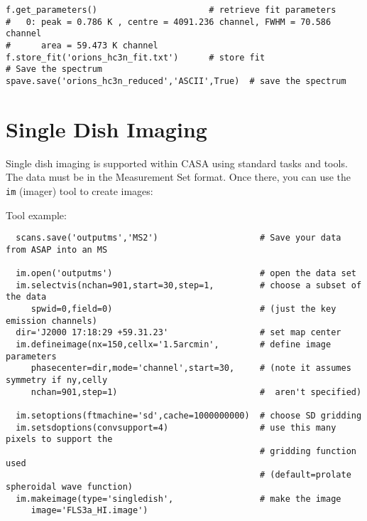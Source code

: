 \small
\begin{verbatim}
f.get_parameters()                      # retrieve fit parameters
#   0: peak = 0.786 K , centre = 4091.236 channel, FWHM = 70.586 channel
#      area = 59.473 K channel
f.store_fit('orions_hc3n_fit.txt')      # store fit                                     
# Save the spectrum
spave.save('orions_hc3n_reduced','ASCII',True)  # save the spectrum                     
\end{verbatim}
\normalsize

\section{Single Dish Imaging}
\label{section:sd.imaging}

Single dish imaging is supported within CASA using standard
tasks and tools. The data must be in the Measurement Set format. Once
there, you can use the {\tt im} (imager) tool
to create images:

Tool example:

\small
\begin{verbatim}
  scans.save('outputms','MS2')                    # Save your data from ASAP into an MS

  im.open('outputms')                             # open the data set
  im.selectvis(nchan=901,start=30,step=1,         # choose a subset of the data   
     spwid=0,field=0)                             # (just the key emission channels) 
  dir='J2000 17:18:29 +59.31.23'                  # set map center                
  im.defineimage(nx=150,cellx='1.5arcmin',        # define image parameters
     phasecenter=dir,mode='channel',start=30,     # (note it assumes symmetry if ny,celly 
     nchan=901,step=1)                            #  aren't specified)
                                                                       
  im.setoptions(ftmachine='sd',cache=1000000000)  # choose SD gridding                
  im.setsdoptions(convsupport=4)                  # use this many pixels to support the 
                                                  # gridding function used
                                                  # (default=prolate spheroidal wave function)
  im.makeimage(type='singledish',                 # make the image
     image='FLS3a_HI.image') 
\end{verbatim}
\normalsize

